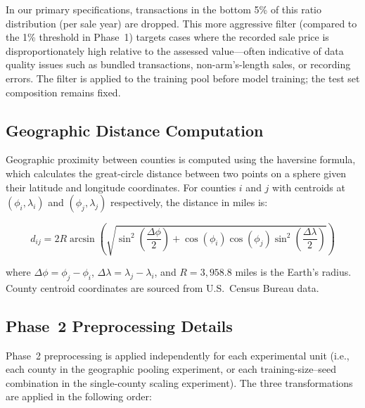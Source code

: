 In our primary specifications, transactions in the bottom 5\% of this ratio distribution (per sale year) are dropped. This more aggressive filter (compared to the 1\% threshold in Phase~1) targets cases where the recorded sale price is disproportionately high relative to the assessed value---often indicative of data quality issues such as bundled transactions, non-arm's-length sales, or recording errors. The filter is applied to the training pool before model training; the test set composition remains fixed.

\subsection{Geographic Distance Computation}\label{app:haversine}

Geographic proximity between counties is computed using the haversine formula, which calculates the great-circle distance between two points on a sphere given their latitude and longitude coordinates. For counties $i$ and $j$ with centroids at $(\phi_i, \lambda_i)$ and $(\phi_j, \lambda_j)$ respectively, the distance in miles is:

\begin{equation}
    d_{ij} = 2R \arcsin\!\left(\sqrt{\sin^2\!\left(\frac{\Delta\phi}{2}\right) + \cos(\phi_i)\cos(\phi_j)\sin^2\!\left(\frac{\Delta\lambda}{2}\right)}\right)
\end{equation}

\noindent where $\Delta\phi = \phi_j - \phi_i$, $\Delta\lambda = \lambda_j - \lambda_i$, and $R = 3{,}958.8$ miles is the Earth's radius. County centroid coordinates are sourced from U.S.\ Census Bureau data.

\subsection{Phase~2 Preprocessing Details}\label{app:phase2_details}

Phase~2 preprocessing is applied independently for each experimental unit (i.e., each county in the geographic pooling experiment, or each training-size--seed combination in the single-county scaling experiment). The three transformations are applied in the following order:

